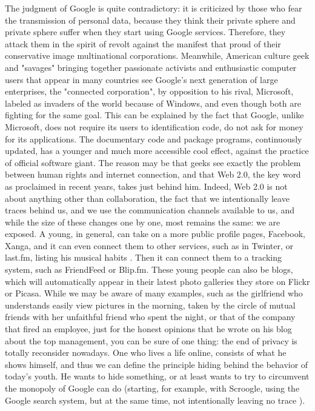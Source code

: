 The judgment of Google is quite contradictory: it is criticized by those who fear the transmission of personal data, because they think their private sphere and private sphere suffer when they start using Google services. Therefore, they attack them in the spirit of revolt against the manifest that proud of their conservative image multinational corporations.
Meanwhile, American culture geek and "savages" bringing together passionate activists and enthusiastic computer users that appear in many countries see Google's next generation of large enterprises, the "connected corporation", by opposition to his rival, Microsoft, labeled as invaders of the world because of Windows, and even though both are fighting for the same goal.
This can be explained by the fact that Google, unlike Microsoft, does not require its users to identification code, do not ask for money for its applications. The documentary code and package programs, continuously updated, has a younger and much more accessible cool effect, against the practice of official software giant.
The reason may be that geeks see exactly the problem between human rights and internet connection, and that Web 2.0, the key word as proclaimed in recent years, takes just behind him.
Indeed, Web 2.0 is not about anything other than collaboration, the fact that we intentionally leave traces behind us, and we use the communication channels available to us, and while the size of these changes one by one, most remains the same: we are exposed.
A young, in general, can take on a more public profile pages, Facebook, Xanga, and it can even connect them to other services, such as in Twinter, or last.fm, listing his musical habits . Then it can connect them to a tracking system, such as FriendFeed or Blip.fm. These young people can also be blogs, which will automatically appear in their latest photo galleries they store on Flickr or Picasa.
While we may be aware of many examples, such as the girlfriend who understands easily view pictures in the morning, taken by the circle of mutual friends with her unfaithful friend who spent the night, or that of the company that fired an employee, just for the honest opinions that he wrote on his blog about the top management, you can be sure of one thing: the end of privacy is totally reconsider nowadays.
One who lives a life online, consists of what he shows himself, and thus we can define the principle hiding behind the behavior of today's youth.
He wants to hide something, or at least wants to try to circumvent the monopoly of Google can do (starting, for example, with Scroogle, using the Google search system, but at the same time, not intentionally leaving no trace ).
